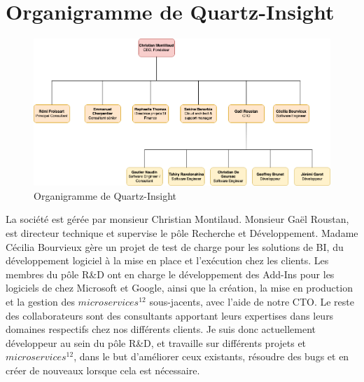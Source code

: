 \documentclass[a4paper, 11pt]{report}
\begin{document}
\section{Organigramme de Quartz-Insight}
\begin{figure}[h]
    \centering
    \includegraphics[scale=0.50,center]{schemas/organigramme-quartz-insight.png}
    \caption{Organigramme de Quartz-Insight}
\end{figure}
La société est gérée par monsieur Christian Montilaud.
Monsieur Gaël Roustan, est directeur technique et supervise le pôle Recherche et Développe\-ment.
Madame Cécilia Bourvieux gère un projet de test de charge pour les solutions de BI, du développement logiciel à la mise en place et l’exécution chez les clients.
Les membres du pôle R\&D ont en charge le développement des Add-Ins pour les logiciels de chez Microsoft et Google, ainsi que la création, la mise en production et la gestion des $microservices^{12}$ sous-jacents, avec l’aide de notre CTO.
Le reste des collaborateurs sont des consultants apportant leurs expertises dans leurs domaines respectifs chez nos différents clients.
\newline
\newline
Je suis donc actuellement développeur au sein du pôle R\&D, et travaille sur différents projets et $microservices^{12}$, dans le but d’améliorer ceux existants, résoudre des bugs et en créer de nouveaux lorsque cela est nécessaire.
\end{document}
